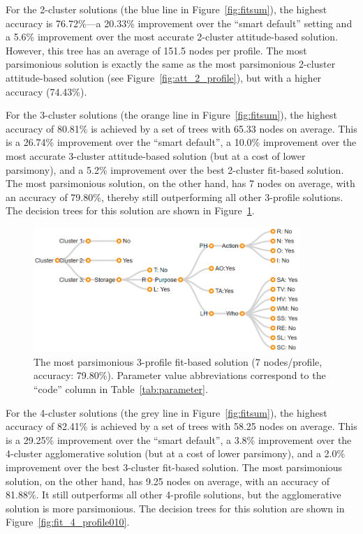 For the 2-cluster solutions (the blue line in Figure~\ref{fig:fitsum}), the highest accuracy is 76.72\%---a 20.33\% improvement over the ``smart default'' setting and a 5.6\% improvement over the most accurate 2-cluster attitude-based solution. However, this tree has an average of 151.5 nodes per profile. The most parsimonious solution is exactly the same as the most parsimonious 2-cluster attitude-based solution (see Figure~\ref{fig:att_2_profile}), but with a higher accuracy (74.43\%).

For the 3-cluster solutions (the orange line in Figure~\ref{fig:fitsum}), the highest accuracy of 80.81\% is achieved by a set of trees with 65.33 nodes on average. This is a 26.74\% improvement over the ``smart default'', a 10.0\% improvement over the most accurate 3-cluster attitude-based solution (but at a cost of lower parsimony), and a 5.2\% improvement over the best 2-cluster fit-based solution. The most parsimonious solution, on the other hand, has 7 nodes on average, with an accuracy of 79.80\%, thereby still outperforming all other 3-profile solutions. The decision trees for this solution are shown in Figure~\ref{fig:fit_3_profile001}.

\begin{figure}
	\centering
	\includegraphics[width=0.9\textwidth]{figures/fit_3_profile001.png}
	\caption{The most parsimonious 3-profile fit-based solution (7 nodes/profile, accuracy: 79.80\%). Parameter value abbreviations correspond to the ``code'' column in Table~\ref{tab:parameter}.}
	\label{fig:fit_3_profile001}
\end{figure}

For the 4-cluster solutions (the grey line in Figure~\ref{fig:fitsum}), the highest accuracy of 82.41\% is achieved by a set of trees with 58.25 nodes on average. This is a 29.25\% improvement over the ``smart default'', a 3.8\% improvement over the 4-cluster agglomerative solution (but at a cost of lower parsimony), and a 2.0\% improvement over the best 3-cluster fit-based solution. The most parsimonious solution, on the other hand, has 9.25 nodes on average, with an accuracy of 81.88\%. It still outperforms all other 4-profile solutions, but the agglomerative solution is more parsimonious. The decision trees for this solution are shown in Figure~\ref{fig:fit_4_profile010}.


